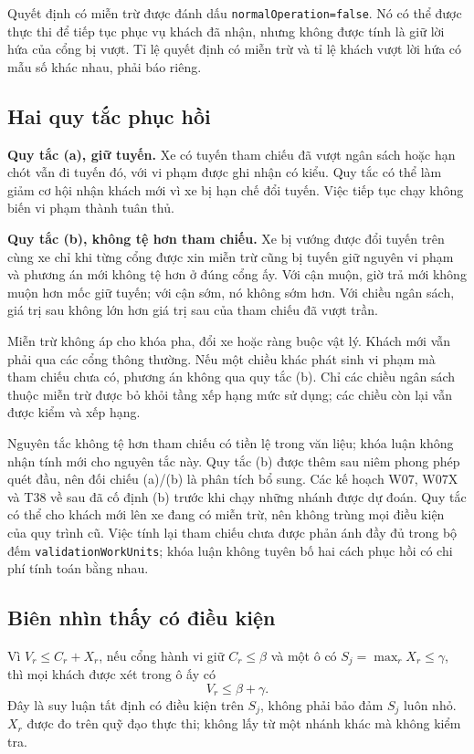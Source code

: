 Quyết định có miễn trừ được đánh dấu \texttt{normalOperation=false}. Nó có thể được thực thi
để tiếp tục phục vụ khách đã nhận, nhưng không được tính là giữ lời hứa của cổng bị vượt.
Tỉ lệ quyết định có miễn trừ và tỉ lệ khách vượt lời hứa có mẫu số khác nhau, phải báo riêng.

\subsection{Hai quy tắc phục hồi}

\textbf{Quy tắc (a), giữ tuyến.} Xe có tuyến tham chiếu đã vượt ngân sách hoặc hạn chót vẫn
đi tuyến đó, với vi phạm được ghi nhận có kiểu. Quy tắc có thể làm giảm cơ hội nhận khách
mới vì xe bị hạn chế đổi tuyến. Việc tiếp tục chạy không biến vi phạm thành tuân thủ.

\textbf{Quy tắc (b), không tệ hơn tham chiếu.} Xe bị vướng được đổi tuyến trên cùng xe chỉ
khi từng cổng được xin miễn trừ cũng bị tuyến giữ nguyên vi phạm và phương án mới không
tệ hơn ở đúng cổng ấy. Với cận muộn, giờ trả mới không muộn hơn mốc giữ tuyến; với cận sớm,
nó không sớm hơn. Với chiều ngân sách, giá trị sau không lớn hơn giá trị sau của tham chiếu
đã vượt trần.

Miễn trừ không áp cho khóa pha, đổi xe hoặc ràng buộc vật lý. Khách mới vẫn phải qua các
cổng thông thường. Nếu một chiều khác phát sinh vi phạm mà tham chiếu chưa có, phương án
không qua quy tắc (b). Chỉ các chiều ngân sách thuộc miễn trừ được bỏ khỏi tầng xếp hạng
mức sử dụng; các chiều còn lại vẫn được kiểm và xếp hạng.

Nguyên tắc không tệ hơn tham chiếu có tiền lệ trong văn liệu; khóa luận không nhận tính mới
cho nguyên tắc này. Quy tắc (b) được thêm sau niêm phong phép quét đầu, nên đối chiếu (a)/(b) là phân tích bổ
sung. Các kế hoạch W07, W07X và T38 về sau đã cố định (b) trước khi chạy những nhánh được
dự đoán. Quy tắc có thể cho khách mới lên xe đang có miễn trừ, nên không trùng mọi điều kiện
của quy trình cũ. Việc tính lại tham chiếu chưa được phản ánh đầy đủ trong bộ đếm
\texttt{validationWorkUnits}; khóa luận không tuyên bố hai cách phục hồi có chi phí tính
toán bằng nhau.

\subsection{Biên nhìn thấy có điều kiện}
\label{muc:biendukien}

Vì $V_r\le C_r+X_r$, nếu cổng hành vi giữ $C_r\le\beta$ và một ô có
$S_j=\max_r X_r\le\gamma$, thì mọi khách được xét trong ô ấy có
\begin{equation}
V_r\le\beta+\gamma.
\end{equation}
Đây là suy luận tất định có điều kiện trên $S_j$, không phải bảo đảm $S_j$ luôn nhỏ. $X_r$
được đo trên quỹ đạo thực thi; không lấy từ một nhánh khác mà không kiểm tra.

